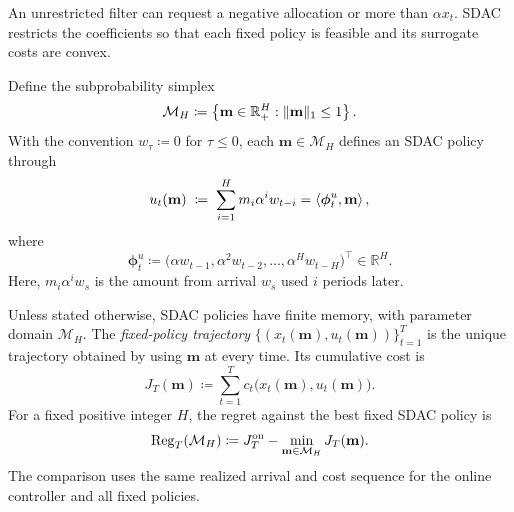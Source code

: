 An unrestricted filter can request a negative allocation or more than
$\alpha x_t$. SDAC restricts the coefficients so that each fixed policy is
feasible and its surrogate costs are convex.


Define the subprobability simplex
\begin{equation}
\label{ch4:eq:def-simplex}
\mathcal{M}_H
\coloneqq
\left\{
\mathbf{m}\in\mathbb{R}_+^H:
\|\mathbf{m}\|_1\le1
\right\}.
\end{equation}
With the convention $w_\tau\coloneqq0$ for $\tau\le0$, each
$\mathbf{m}\in\mathcal{M}_H$ defines an SDAC policy through
\begin{equation}
\label{ch4:eq:def-sdac-policy}
u_t(\mathbf{m})
\;\coloneqq\;
\sum_{i=1}^{H} m_i\alpha^i w_{t-i}
=
\left\langle \boldsymbol{\phi}_t^u,\mathbf{m} \right\rangle,
\end{equation}
where
\begin{equation}
\label{ch4:eq:def-phi-u}
\boldsymbol{\phi}_t^u
\coloneqq
\bigl(\alpha w_{t-1},\alpha^2 w_{t-2},\ldots,\alpha^H w_{t-H}\bigr)^\top
\in\mathbb{R}^H.
\end{equation}
Here, $m_i\alpha^i w_s$ is the amount from arrival $w_s$ used $i$ periods later.

Unless stated otherwise, SDAC policies have finite memory, with parameter
domain $\mathcal M_H$.
The \emph{fixed-policy trajectory}
$\{(x_t(\mathbf m),u_t(\mathbf m))\}_{t=1}^T$ is the unique trajectory
obtained by using $\mathbf m$ at every time.
Its cumulative cost is
\begin{equation}
\label{ch4:eq:def-fixed-policy-cost}
J_T(\mathbf{m})
\coloneqq
\sum_{t=1}^T c_t\bigl(x_t(\mathbf{m}),u_t(\mathbf{m})\bigr).
\end{equation}
For a fixed positive integer $H$, the regret against the best fixed
SDAC policy is
\begin{equation}
\label{ch4:eq:def-regret}
\mathrm{Reg}_T(\mathcal M_H)
\coloneqq
J_T^{\mathrm{on}}
-\min_{\mathbf{m}\in\mathcal{M}_H}J_T(\mathbf{m}).
\end{equation}
The comparison uses the same realized arrival and cost sequence for the
online controller and all fixed policies.

